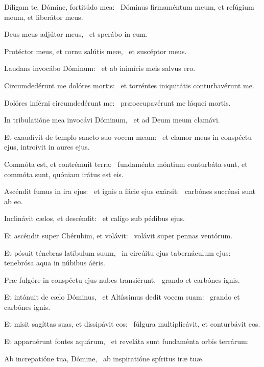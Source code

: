 \item Díligam te, Dómine, fortitúdo mea:~\psstar{} Dóminus firmaméntum meum, et refúgium meum, et liberátor meus.

\item Deus meus adjútor meus,~\psstar{} et sperábo in eum.

\item Protéctor meus, et cornu salútis meæ,~\psstar{} et suscéptor meus.

\item Laudans invocábo Dóminum:~\psstar{} et ab inimícis meis salvus ero.

\item Circumdedérunt me dolóres mortis:~\psstar{} et torréntes iniquitátis conturbavérunt me.

\item Dolóres inférni circumdedérunt me:~\psstar{} præoccupavérunt me láquei mortis.

\item In tribulatióne mea invocávi Dóminum,~\psstar{} et ad Deum meum clamávi.

\item Et exaudívit de templo sancto suo vocem meam:~\psstar{} et clamor meus in conspéctu ejus, introívit in aures ejus.

\item Commóta est, et contrémuit terra:~\psstar{} fundaménta móntium conturbáta sunt, et commóta sunt, quóniam irátus est eis.

\item Ascéndit fumus in ira ejus:~\pscross{} et ignis a fácie ejus exársit:~\psstar{} carbónes succénsi sunt ab eo.

\item Inclinávit cælos, et descéndit:~\psstar{} et calígo sub pédibus ejus.

\item Et ascéndit super Chérubim, et volávit:~\psstar{} volávit super pennas ventórum.

\item Et pósuit ténebras latíbulum suum,~\pscross{} in circúitu ejus tabernáculum ejus:~\psstar{} tenebrósa aqua in núbibus áëris.

\item Præ fulgóre in conspéctu ejus nubes transiérunt,~\psstar{} grando et carbónes ignis.

\item Et intónuit de cælo Dóminus,~\pscross{} et Altíssimus dedit vocem suam:~\psstar{} grando et carbónes ignis.

\item Et misit sagíttas suas, et dissipávit eos:~\psstar{} fúlgura multiplicávit, et conturbávit eos.

\item Et apparuérunt fontes aquárum,~\psstar{} et reveláta sunt fundaménta orbis terrárum:

\item Ab increpatióne tua, Dómine,~\psstar{} ab inspiratióne spíritus iræ tuæ.